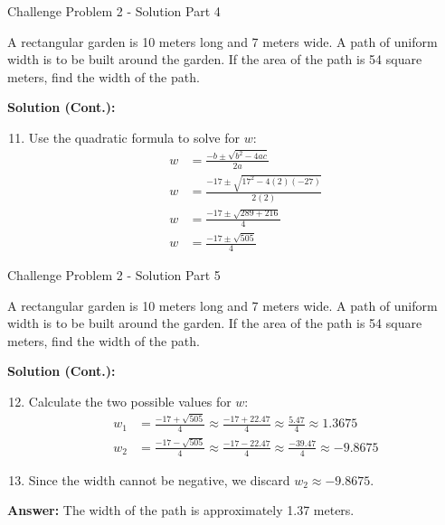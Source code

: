 \documentclass[aspectratio=169]{beamer}
\begin{document}
\begin{frame}{Challenge Problem 2 - Solution Part 4}
    \begin{tcolorbox}[colback=lightgray,colframe=accent,title=Detailed Solution (Part 4)]
        \footnotesize
        A rectangular garden is 10 meters long and 7 meters wide. A path of uniform width is to be built around the garden. If the area of the path is 54 square meters, find the width of the path.
        
        \textbf{Solution (Cont.):}
        \begin{enumerate}
            \setcounter{enumi}{10} %
            \setlength{\itemsep}{0.5em}
            \item Use the quadratic formula to solve for $w$:
            \begin{align*}
                w &= \frac{-b \pm \sqrt{b^2 - 4ac}}{2a} \\
                w &= \frac{-17 \pm \sqrt{17^2 - 4(2)(-27)}}{2(2)} \\
                w &= \frac{-17 \pm \sqrt{289 + 216}}{4} \\
                w &= \frac{-17 \pm \sqrt{505}}{4}
            \end{align*}
        \end{enumerate}
    \end{tcolorbox}
\end{frame}

\begin{frame}{Challenge Problem 2 - Solution Part 5}
    \begin{tcolorbox}[colback=lightgray,colframe=accent,title=Detailed Solution (Part 5)]
        \footnotesize
        A rectangular garden is 10 meters long and 7 meters wide. A path of uniform width is to be built around the garden. If the area of the path is 54 square meters, find the width of the path.
        
        \textbf{Solution (Cont.):}
        \begin{enumerate}
            \setcounter{enumi}{11} %
            \setlength{\itemsep}{0.5em}
            \item Calculate the two possible values for $w$:
            \begin{align*}
                w_1 &= \frac{-17 + \sqrt{505}}{4} \approx \frac{-17 + 22.47}{4} \approx \frac{5.47}{4} \approx 1.3675 \\
                w_2 &= \frac{-17 - \sqrt{505}}{4} \approx \frac{-17 - 22.47}{4} \approx \frac{-39.47}{4} \approx -9.8675
            \end{align*}
            \item Since the width cannot be negative, we discard $w_2 \approx -9.8675$.
        \end{enumerate}
        
        \textbf{Answer:} The width of the path is approximately 1.37 meters.
    \end{tcolorbox}
\end{frame}
\end{document}
